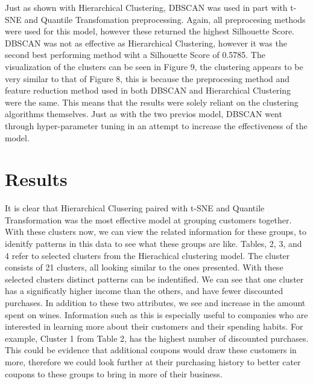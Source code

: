 \documentclass[twocolumn]{article}
\begin{document}
Just as shown with Hierarchical Clustering, DBSCAN was used in part with t-SNE and Quantile Transfomation preprocessing. Again, all preprocesing methods were used for this model, however these returned the highest Silhouette Score. DBSCAN was not as effective as Hierarchical Clustering, however it was the second best performing method wiht a Silhouette Score of 0.5785. The visualization of the clusters can be seen in Figure 9, the clustering appears to be very similar to that of Figure 8, this is because the preprocesing method and feature reduction method used in both DBSCAN and Hierarchical Clustering were the same. This means that the results were solely reliant on the clustering algorithms themselves. Just as with the two previos model, DBSCAN went through hyper-parameter tuning in an attempt to increase the effectiveness of the model.

\section{Results}

It is clear that Hierarchical Clusering paired with t-SNE and Quantile Transformation was the most effective model at grouping customers together. With these clusters now, we can view the related information for these groups, to idenitfy patterns in this data to see what these groups are like. Tables, 2, 3, and 4 refer to selected clusters from the Hierachical clustering model. The cluster consists of 21 clusters, all looking similar to the ones presented. With these selected clusters distinct patterns can be indentified. We can see that one cluster has a significatly higher income than the others, and have fewer discounted purchases. In addition to these two attributes, we see and increase in the amount spent on wines. Information such as this is especially useful to companies who are interested in learning more about their customers and their spending habits. For example, Cluster 1 from Table 2, has the highest number of discounted purchases. This could be evidence that additional coupons would draw these customers in more, therefore we could look further at their purchasing history to better cater coupons to these groups to bring in more of their business.
\end{document}
